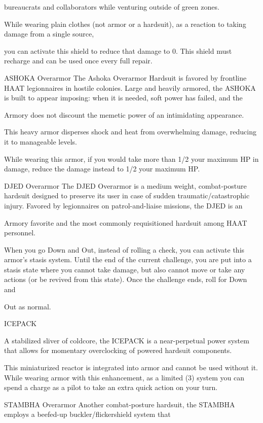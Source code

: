 bureaucrats and collaborators while venturing outside of green zones.

While wearing plain clothes (not armor or a hardsuit), as a reaction to taking damage from a single source,

you can activate this shield to reduce that damage to 0. This shield must recharge and can be used once
every full repair.


ASHOKA Overarmor
The Ashoka Overarmor Hardsuit is favored by frontline HAAT legionnaires in hostile colonies. Large and
heavily armored, the ASHOKA is built to appear imposing: when it is needed, soft power has failed, and the

Armory does not discount the memetic power of an intimidating appearance.

This heavy armor disperses shock and heat from overwhelming damage, reducing it to manageable levels.

While wearing this armor, if you would take more than 1/2 your maximum HP in damage, reduce the
damage instead to 1/2 your maximum HP.


DJED Overarmor
The DJED Overarmor is a medium weight, combat-posture hardsuit designed to preserve its user in case of
sudden traumatic/catastrophic injury. Favored by legionnaires on patrol-and-liaise missions, the DJED is an

Armory favorite and the most commonly requisitioned hardsuit among HAAT personnel.




When you go Down and Out, instead of rolling a check, you can activate this armor's stasis system. Until
the end of the current challenge, you are put into a stasis state where you cannot take damage, but also
cannot move or take any actions (or be revived from this state). Once the challenge ends, roll for Down and

Out as normal.


ICEPACK

A stabilized sliver of coldcore, the ICEPACK is a near-perpetual power system that allows for momentary
overclocking of powered hardsuit components.

This miniaturized reactor is integrated into armor and cannot be used without it. While wearing armor with
this enhancement, as a limited (3) system you can spend a charge as a pilot to take an extra quick action
on your turn.


STAMBHA Overarmor
Another combat-posture hardsuit, the STAMBHA employs a beefed-up buckler/flickershield system that

